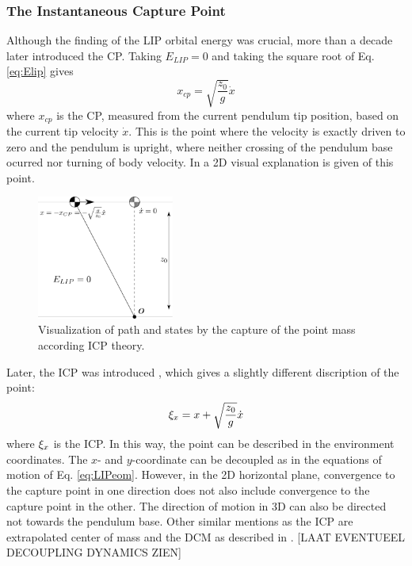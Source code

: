 \subsubsection{The Instantaneous Capture Point}
Although the finding of the \ac{LIP} orbital energy was crucial, more than a decade later \cite{pratt2006capture} introduced the \ac{CP}. Taking $E_{LIP}=0$ and taking the square root of Eq.  \eqref{eq:Elip} gives
\begin{equation}
x_{cp}=\sqrt{ \frac{z_0}{g}}\dot{x} 
\label{eq:cp}
\end{equation}
where $x_{cp}$ is the \ac{CP}, measured from the current pendulum tip position, based on the current tip velocity $\dot{x}$. This is the point where the velocity is exactly driven to zero and the pendulum is upright, where neither crossing of the pendulum base ocurred nor turning of body velocity. In  a \ac{2D} visual explanation is given of this point.
\begin{figure}[h]
\centering
\includegraphics[width=0.4\textwidth]{STYLESTUFF/2DICP.png}
\caption{Visualization of path and states by the capture of the point mass according \ac{ICP} theory.}
\label{fig:2dicp}
\end{figure}
Later, the \ac{ICP} was introduced \cite{koolen2012capturability}, which gives a slightly different discription of the point:
\begin{equation}
\xi_x=x+\sqrt{ \frac{z_0}{g}}\dot{x} 
\label{eq:icp}
\end{equation}
where $\xi_x$ is the \ac{ICP}. In this way, the point can be described in the environment coordinates.
The $x$- and $y$-coordinate can be decoupled as in the equations of motion of Eq. \eqref{eq:LIPeom}. However, in the \ac{2D} horizontal plane, convergence to the capture point in one direction does not also include convergence to the capture point in the other. The direction of motion in \ac{3D} can also be directed not towards the pendulum base. Other similar mentions as the \ac{ICP} are extrapolated center of mass \cite{hof2008extrapolated} and the \ac{DCM} as described in \cite{takenaka2009real}. [LAAT  EVENTUEEL DECOUPLING DYNAMICS ZIEN]

